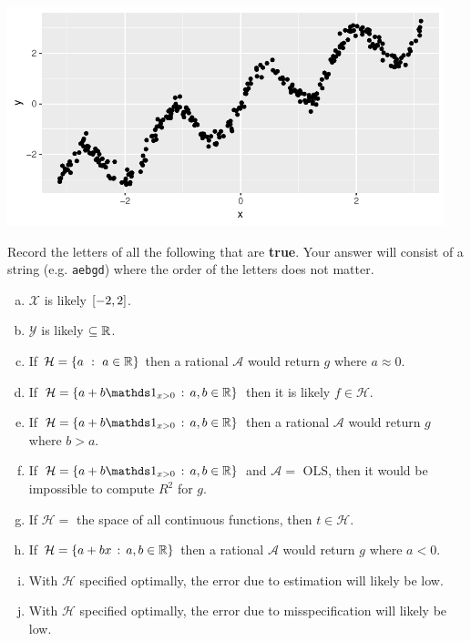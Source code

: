 \documentclass[12pt]{article}
\begin{document}
\beqn
\centering\includegraphics[width=5in]{curvyline.pdf}
\eeqn

\benum

 Record the letters of all the following that are \textbf{true}. Your answer will consist of a string (e.g. \texttt{aebgd}) where the order of the letters does not matter.

\begin{enumerate}[(a)]
\item $\mathcal{X}$ is likely $\left[-2,2\right]$.
\item $\mathcal{Y}$ is likely $\subseteq \mathbb{R}$.
\item If $\mathcal{H} = \left\{a~:~a \in \mathbb{R}\right\}$ then a rational $\mathcal{A}$ would return $g$ where $a \approx 0$.
\item If $\mathcal{H} = \braces{a + b \indic{x > 0}\,:\,a,b \in \reals}$ then it is likely $f \in \mathcal{H}$.
\item If $\mathcal{H} = \braces{a + b \indic{x > 0}\,:\,a,b \in \reals}$ then a rational $\mathcal{A}$ would return $g$ where $b > a$.
\item If $\mathcal{H} = \braces{a + b \indic{x > 0}\,:\,a,b \in \reals}$ and $\mathcal{A} =$ OLS, then it would be impossible to compute $R^2$ for $g$.
\item If $\mathcal{H} =$ the space of all continuous functions, then $t \in \mathcal{H}$.
\item If $\mathcal{H} = \left\{a + b x\,:\,a,b \in \mathbb{R}\right\}$ then a rational $\mathcal{A}$ would return $g$ where $a < 0$.
\item With $\mathcal{H}$ specified optimally, the error due to estimation will likely be low.
\item With $\mathcal{H}$ specified optimally, the error due to misspecification will likely be low.
\end{enumerate}
\eenum\pagebreak
\end{document}
